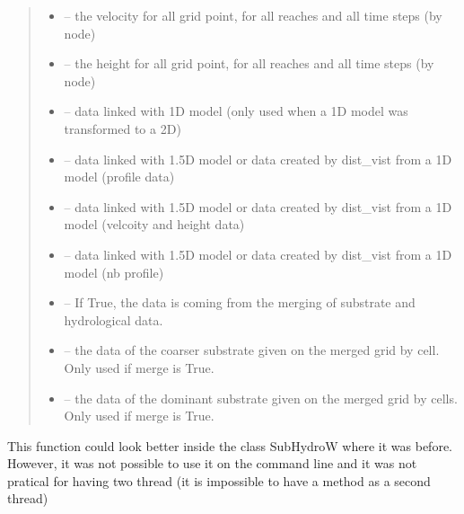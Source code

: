 \documentclass[letterpaper,10pt,english]{sphinxmanual}
\begin{document}
\begin{fulllineitems}
\begin{quote}
\begin{description}
\begin{itemize}
\item {} 
 -- the velocity for all grid point, for all reaches and all time steps (by node)

\item {} 
 -- the height for all grid point, for all reaches and all time steps (by node)

\item {} 
 -- data linked with 1D model (only used when a 1D model was transformed to a 2D)

\item {} 
 -- data linked with 1.5D model or data created by dist\_vist from a 1D model (profile data)

\item {} 
 -- data linked with 1.5D model or data created by dist\_vist from a 1D model (velcoity and height data)

\item {} 
 -- data linked with 1.5D model or data created by dist\_vist from a 1D model (nb profile)

\item {} 
 -- If True, the data is coming from the merging of substrate and hydrological data.

\item {} 
 -- the data of the coarser substrate given on the merged grid by cell. Only used if merge is True.

\item {} 
 -- the data of the dominant substrate given on the merged grid by cells. Only used if merge is True.

\end{itemize}

\end{description}\end{quote}


This function could look better inside the class SubHydroW where it was before. However, it was not possible
to use it on the command line and it was not pratical for having two thread (it is impossible to have a method
as a second thread)


\end{fulllineitems}
\end{document}
